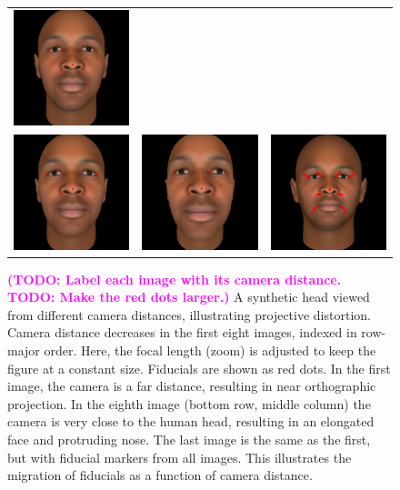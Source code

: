 \documentclass[runningheads]{llncs}
\newcommand {\ericnote} [1] {{\bf \textcolor{magenta}{(#1)}}}
\begin{document}
\begin{figure}[ht!]
\begin{tabular}{ccc}
\includegraphics[width=.33\linewidth]{resources/figures/extracted_fiducial_0004.png} \\
\includegraphics[width=.33\linewidth]{resources/figures/extracted_fiducial_0005.png} &
\includegraphics[width=.33\linewidth]{resources/figures/extracted_fiducial_0007.png} &
\includegraphics[width=.33\linewidth]{resources/figures/fiducial_migration.png}
\end{tabular}
\caption{
\ericnote{TODO: Label each image with its camera distance. TODO: Make the red dots larger.}
A synthetic head viewed from different camera distances, illustrating projective distortion.
Camera distance decreases in the first eight images, indexed in row-major order.
Here, the focal length (zoom) is adjusted to keep the figure at a constant size.
Fiducials are shown as red dots.
In the first image, the camera is a far distance, resulting in near orthographic projection.
In the eighth image (bottom row, middle column) the camera is very close to the human head, resulting in an elongated face and protruding nose.  
The last image is the same as the first, but with fiducial markers from all images.
This illustrates the migration of fiducials as a function of camera distance. 
} 
\label{fig:fiducial_migration}
\end{figure}
\end{document}
